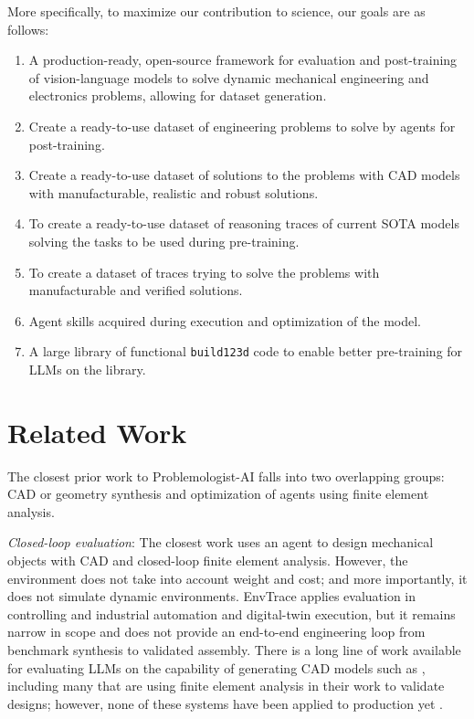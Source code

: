 \documentclass[conference]{IEEEtran}
\begin{document}
More specifically, to maximize our contribution to science, our goals are as follows:

\begin{enumerate}
    \item A production-ready, open-source framework for evaluation and post-training of vision-language models to solve dynamic mechanical engineering and electronics problems, allowing for dataset generation.
    \item Create a ready-to-use dataset of engineering problems to solve by agents for post-training.
    \item Create a ready-to-use dataset of solutions to the problems with CAD models with manufacturable, realistic and robust solutions.
    \item To create a ready-to-use dataset of reasoning traces of current SOTA models solving the tasks to be used during pre-training.
    \item To create a dataset of traces trying to solve the problems with manufacturable and verified solutions.
    \item Agent skills acquired during execution and optimization of the model.
    \item A large library of functional \texttt{build123d} code to enable better pre-training for LLMs on the library.
\end{enumerate}

\section{Related Work}
The closest prior work to Problemologist-AI falls into two overlapping groups: CAD or geometry synthesis and optimization of agents using finite element analysis.

\textit{Closed-loop evaluation}: The closest work \cite{ref27} uses an agent to design mechanical objects with CAD and closed-loop finite element analysis. However, the environment does not take into account weight and cost; and more importantly, it does not simulate dynamic environments. EnvTrace \cite{ref34} applies evaluation in controlling and industrial automation and digital-twin execution, but it remains narrow in scope and does not provide an end-to-end engineering loop from benchmark synthesis to validated assembly. There is a long line of work available for evaluating LLMs on the capability of generating CAD models such as \cite{ref35,ref37}, including many that are using finite element analysis \cite{ref36} in their work to validate designs; however, none of these systems have been applied to production yet \cite{ref40}.
\end{document}
